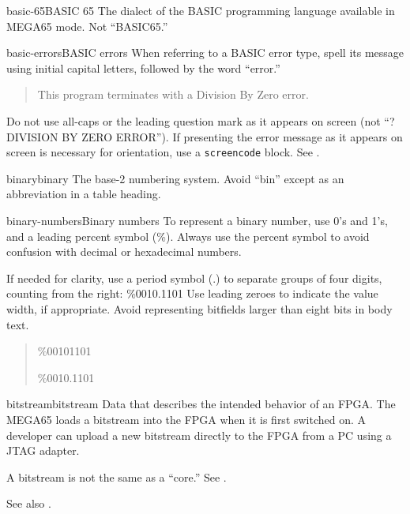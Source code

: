 \begin{sgentry}{basic-65}{BASIC 65}
    The dialect of the BASIC programming language available in MEGA65 mode. Not ``BASIC65.''
\end{sgentry}

\begin{sgentry}{basic-errors}{BASIC errors}
    When referring to a BASIC error type, spell its message using initial capital letters, followed by the word ``error.''

    \begin{quote}
        This program terminates with a Division By Zero error.
    \end{quote}

    Do not use all-caps or the leading question mark as it appears on screen (not ``?DIVISION BY ZERO ERROR''). If presenting the error message as it appears on screen is necessary for orientation, use a \texttt{screencode} block. See .
\end{sgentry}

\begin{sgentry}{binary}{binary}
    The base-2 numbering system. Avoid ``bin'' except as an abbreviation in a table heading.
\end{sgentry}

\begin{sgentry}{binary-numbers}{Binary numbers}
    To represent a binary number, use 0's and 1's, and a leading percent symbol (\%). Always use the percent symbol to avoid confusion with decimal or hexadecimal numbers.

    If needed for clarity, use a period symbol (.) to separate groups of four digits, counting from the right: \%0010.1101 Use leading zeroes to indicate the value width, if appropriate. Avoid representing bitfields larger than eight bits in body text.

    \begin{quote}
        \%00101101

        \%0010.1101
    \end{quote}
\end{sgentry}

\begin{sgentry}{bitstream}{bitstream}
    Data that describes the intended behavior of an FPGA. The MEGA65 loads a bitstream into the FPGA when it is first switched on. A developer can upload a new bitstream directly to the FPGA from a PC using a JTAG adapter.

    A bitstream is not the same as a ``core.'' See .

    See also .
\end{sgentry}

